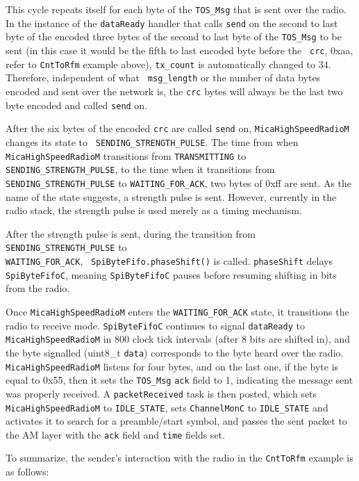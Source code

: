 \documentclass[11pt]{article}
\begin{document}
This cycle repeats itself for each byte of the {\tt TOS\_Msg} that is
sent over the radio. In the instance of the {\tt dataReady} handler
that calls {\tt send} on the second to last byte of the encoded three
bytes of the second to last byte of the {\tt TOS\_Msg} to be sent (in
this case it would be the fifth to last encoded byte before the {\tt
crc}, 0xaa, refer to {\tt CntToRfm} example above), {\tt tx\_count} is
automatically changed to 34.  Therefore, independent of what {\tt
msg\_length} or the number of data bytes encoded and sent over the
network is, the {\tt crc} bytes will always be the last two byte
encoded and called {\tt send} on.

After the six bytes of the encoded {\tt crc} are called {\tt send} on,
{\tt MicaHighSpeedRadioM} changes its state to {\tt
SENDING\_STRENGTH\_PULSE}. The time from when {\tt
MicaHighSpeedRadioM} transitions from {\tt TRANSMITTING} to {\tt
SENDING\_STRENGTH\_PULSE}, to the time when it transitions from \\
{\tt SENDING\_STRENGTH\_PULSE} to {\tt WAITING\_FOR\_ACK}, two bytes
of 0xff are sent. As the name of the state suggests, a strength pulse
is sent. However, currently in the radio stack, the strength pulse is
used merely as a timing mechanism.

After the strength pulse is sent, during the transition from {\tt
SENDING\_STRENGTH\_PULSE} to \\
{\tt WAITING\_FOR\_ACK}, {\tt
SpiByteFifo.phaseShift()} is called. {\tt phaseShift} delays {\tt
SpiByteFifoC}, meaning {\tt SpiByteFifoC} pauses before resuming
shifting in bits from the radio.

Once {\tt MicaHighSpeedRadioM} enters the {\tt WAITING\_FOR\_ACK} state, it
transitions the radio to receive mode. {\tt SpiByteFifoC} continues to
signal {\tt dataReady} to {\tt MicaHighSpeedRadioM} in 800 clock tick intervals
(after 8 bits are shifted in), and the byte signalled (uint8\_t {\tt data}) corresponds to the byte heard
over the radio. {\tt MicaHighSpeedRadioM} listens for four bytes, and on the
last one, if the byte is equal to 0x55, then it sets the {\tt TOS\_Msg} {\tt ack}
field to 1, indicating the message sent was properly received. A
{\tt packetReceived} task is then posted, which sets {\tt MicaHighSpeedRadioM} to
{\tt IDLE\_STATE}, sets {\tt ChannelMonC} to {\tt IDLE\_STATE} and activates it to search for a preamble/start
symbol, and passes the sent packet to the AM layer with the {\tt ack} field and {\tt time} fields
set.

To summarize, the sender's interaction with the radio in the
{\tt CntToRfm} example is as follows:
\end{document}
